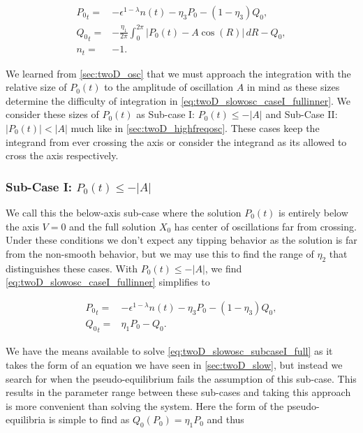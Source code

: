 \begin{equation}\label{eq:twoD_slowosc_caseI_fullinner}
\begin{aligned}
{P_0}_t =&  -\epsilon^{1-\lambda} n(t) -\eta_3 P_0-(1-\eta_3)Q_0, \\
{Q_0}_t =&  -\frac{\eta_1}{2\pi}\int_0^{2\pi}|P_0(t)-A\cos(R)|\,dR-Q_0,\\
n_t =& -1.
\end{aligned}
\end{equation}

We learned from \autoref{sec:twoD_osc} that we must approach the integration with the relative size of $P_0(t)$ to the amplitude of oscillation $A$ in mind as these sizes determine the difficulty of integration in \eqref{eq:twoD_slowosc_caseI_fullinner}. We consider these sizes of $P_0(t)$ as Sub-case I: $P_0(t)\le -|A|$ and Sub-Case II:$|P_0(t)|<|A|$ much like in \autoref{sec:twoD_highfreqosc}. These cases keep the integrand from ever crossing the axis or consider the integrand as its allowed to cross the axis respectively.

\subsubsection{Sub-Case I: $P_0(t)\le -|A|$}

We call this the below-axis sub-case where the solution $P_0(t)$ is entirely below the axis $V=0$ and the full solution $X_0$ has center of oscillations far from crossing. Under these conditions we don't expect any tipping behavior as the solution is far from the non-smooth behavior, but we may use this to find the range of $\eta_2$ that distinguishes these cases. With $P_0(t)\le -|A|$, we find \eqref{eq:twoD_slowosc_caseI_fullinner} simplifies to

\begin{equation}\label{eq:twoD_slowosc_subcaseI_full}
\begin{aligned}
{P_0}_t =&  -\epsilon^{1-\lambda} n(t) -\eta_3 P_0-(1-\eta_3)Q_0, \\
{Q_0}_t =&  \eta_1 P_0-Q_0.
\end{aligned}
\end{equation}

We have the means available to solve \eqref{eq:twoD_slowosc_subcaseI_full} as it takes the form of an equation we have seen in \autoref{sec:twoD_slow}, but instead we search for when the pseudo-equilibrium fails the assumption of this sub-case. This results in the parameter range between these sub-cases and taking this approach is more convenient than solving the system. Here the form of the pseudo-equilibria is simple to find as $Q_0(P_0) = \eta_1P_0$ and thus 

